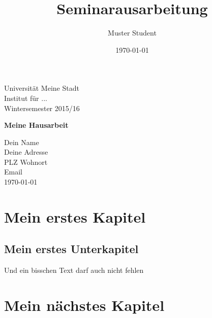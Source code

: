 \documentclass[12pt]{article}
\title{Seminarausarbeitung}
\author {Muster Student}
\date{ \today}
\begin{document}
\begin{titlepage} 
  \begin{small}
    \vfill \hspace*{-0.78cm} Universität Meine Stadt\\ Institut für ... \\ Wintersemester 2015/16
  \end{small}
  \begin{center}
    \begin{Large}
      \vfill {\textsf{\textbf{Meine Hausarbeit}}}
    \end{Large}
  \end{center}
    \begin{small}
    \vfill Dein Name \\ Deine Adresse \\  PLZ Wohnort \\  Email\\ 
    \today
  \end{small}
\end{titlepage}
\newpage

\tableofcontents

\newpage

\section{Mein erstes Kapitel}

\subsection{Mein erstes Unterkapitel}

Und ein bisschen Text darf auch nicht fehlen \cite{macklin2013position}

\section{Mein nächstes Kapitel}


\newpage


\end{document}
